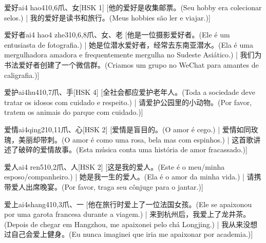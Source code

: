\begin{entry}{爱好}{ai4 hao4}{10,6}{⽖、⼥}[HSK 1]
  [他的爱好是收集邮票。(Seu hobby era colecionar selos.)  | 我的爱好是读书和旅行。(Meus hobbies são ler e viajar.)]
\end{entry}

\begin{entry}{爱好者}{ai4 hao4 zhe3}{10,6,8}{⽖、⼥、⽼}
  [他是一位摄影爱好者。(Ele é um entusiasta de fotografia.) | 她是位潜水爱好者，经常去东南亚潜水。(Ela é uma mergulhadora amadora e frequentemente mergulha no Sudeste Asiático.)  | 我们为书法爱好者创建了一个微信群。(Criamos um grupo no WeChat para amantes de caligrafia.)]
\end{entry}

\begin{entry}{爱护}{ai4hu4}{10,7}{⽖、⼿}[HSK 4]
  [全社会都应爱护老年人。(Toda a sociedade deve tratar os idosos com cuidado e respeito.) | 请爱护公园里的小动物。(Por favor, tratem os animais do parque com cuidado.)]
\end{entry}

\begin{entry}{爱情}{ai4qing2}{10,11}{⽖、⼼}[HSK 2]
  [爱情是盲目的。(O amor é cego.) | 爱情如同玫瑰，美丽却带刺。(O amor é como uma rosa, bela mas com espinhos.)  | 这首歌讲述了破碎的爱情故事。(Esta música conta uma história de amor fracassado.)]
\end{entry}

\begin{entry}{爱人}{ai4 ren5}{10,2}{⽖、⼈}[HSK 2]
  [这是我的爱人。(Este é o meu/minha esposo/companheiro.) | 她是我一生的爱人。(Ela é o amor da minha vida.) | 请携带爱人出席晚宴。(Por favor, traga seu cônjuge para o jantar.)]
\end{entry}

\begin{entry}{爱上}{ai4shang4}{10,3}{⽖、⼀}
  [他在旅行时爱上了一位法国女孩。(Ele se apaixonou por uma garota francesa durante a viagem.)  | 来到杭州后，我爱上了龙井茶。(Depois de chegar em Hangzhou, me apaixonei pelo chá Longjing.) | 我从来没想过自己会爱上健身。(Eu nunca imaginei que iria me apaixonar por academia.)]
\end{entry}

